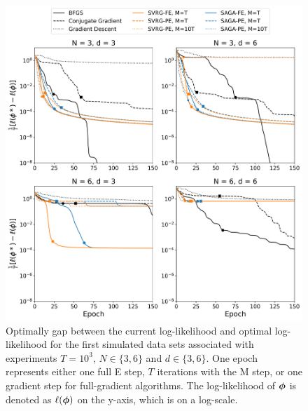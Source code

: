 \documentclass[12pt]{article}
\begin{document}
\begin{figure}[H]
    \centering
    \includegraphics[width=6.5in]{../plt/log-like_v_epoch_T-1000-000.png}
    \caption{Optimally gap between the current log-likelihood and optimal log-likelihood for the first simulated data sets associated with experiments $T=10^{3}$, $N \in \{3,6\}$ and $d \in \{3,6\}$. One epoch represents either one full E step, $T$ iterations with the M step, or one gradient step for full-gradient algorithms. The log-likelihood of $\boldsymbol{\phi}$ is denoted as $\ell(\boldsymbol{\phi})$ on the y-axis, which is on a log-scale.}
\end{figure}
%
\end{document}
